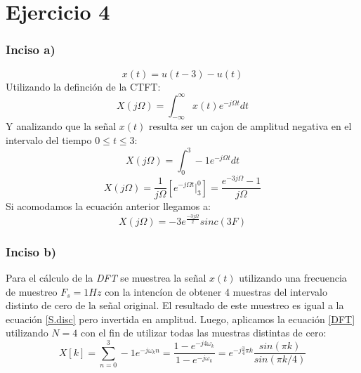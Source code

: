 \documentclass[letterpaper]{article}
\begin{document}
    

\section{Ejercicio 4}

\subsubsection*{Inciso a)}
\begin{equation}
    x(t)=u(t-3)-u(t)
\end{equation}
Utilizando la definción de la CTFT:
\begin{equation}
    X(j\Omega)=\int_{-\infty}^{\infty} x(t)e^{-j\Omega t}dt
\end{equation}
Y analizando que la señal $x(t)$ resulta ser un cajon de amplitud negativa en el intervalo del tiempo $0\leq t \leq 3$:
\begin{equation}
    X(j\Omega)=\int_{0}^{3} -1e^{-j\Omega t}dt
\end{equation}
\begin{equation}
    X(j\Omega)=\frac{1}{j\Omega} \left[e^{-j\Omega t} \vert_{3}^{0}\right] = \frac{e^{-3j\Omega} - 1}{j\Omega}
\end{equation}
Si acomodamos la ecuación anterior llegamos a:
\begin{equation}
    X(j\Omega) = -3e^{\frac{-3j\Omega}{2}} sinc(3F)
\end{equation}
\subsubsection*{Inciso b)}
Para el cálculo de la \textit{DFT} se muestrea la señal $x(t)$ utilizando una frecuencia de muestreo $F_s=1Hz$ con la intencíon de obtener 4 muestras del intervalo distinto de cero de la señal original. El resultado de
este muestreo es igual a la ecuación \ref{S.disc} pero invertida en amplitud. Luego, aplicamos la ecuación \ref{DFT} utilizando $N=4$ con el fin de utilizar todas las muestras distintas de cero:
\begin{equation}
    X[k]=\sum_{n=0}^{3}-1e^{-j\omega_k n} = \frac{1 - e^{-j4\omega_k}}{1-e^{-j\omega_k}} = e^{-j\frac{3}{4}\pi k} \frac{sin(\pi k)}{sin(\pi k/4)}
\end{equation} 
\end{document}
